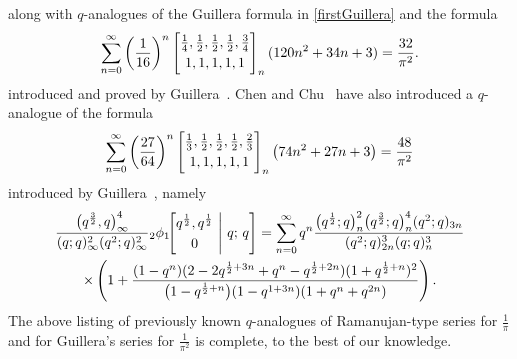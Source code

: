 \documentclass[12pt]{article}
\begin{document}
 along with $q$-analogues of the Guillera formula in \eqref{firstGuillera} and the formula 
 \begin{equation}\label{Guillera16squared}
 \sum_{n=0}^{\infty} \left( \frac{1}{16} \right)^{n} 
 \left[ \begin{matrix} 
 \frac{1}{4}, \frac{1}{2}, \frac{1}{2}, \frac{1}{2}, \frac{3}{4} \vspace{1mm} \\ 
 1, 1, 1, 1, 1 \end{matrix} \right]_{n} (120 n^2+34 n+3) = \frac{32}{\pi ^2}. 
\end{equation}
 introduced and proved by Guillera~\cite{Guillera2002}. 
 Chen and Chu~\cite{ChenChu2021IJNT} have also introduced a $q$-analogue of 
 the formula 
\begin{equation*}
 \sum_{n=0}^{\infty} 
 \left( \frac{27}{64} \right)^{n} 
 \left[ \begin{matrix} 
 \frac{1}{3}, \frac{1}{2}, \frac{1}{2}, \frac{1}{2}, \frac{2}{3} \vspace{1mm} \\ 
 1, 1, 1, 1, 1 \end{matrix} \right]_{n} \left( 74n^2 + 27 n + 3 \right) 
 = \frac{48}{\pi ^2} 
 \end{equation*}
 introduced by Guillera~\cite{Guillera2011}, namely 
 \begin{multline*} 
 \frac{ \big( q^{\frac{3}{2}}, q \big)_{\infty}^{4} }{ 
 (q;q)_{\infty}^{2} (q^2;q)_{\infty}^{2} } {}_{2}\phi_{1}\!\!\left[ \begin{matrix} 
 q^{\frac{1}{2}}, q^{\frac{1}{2}} \vspace{1mm}\\ 
 0 \end{matrix} \ \Bigg| \ q; \, q 
 \right] = \sum_{n=0}^{\infty} q^{n} 
 \frac{ \big( q^{\frac{1}{2}}; q \big)_{n}^{2} 
 \big( q^{\frac{3}{2}}; q \big)_{n}^{4} 
 (q^2;q)_{3n} }{ (q^2;q)_{2n}^{3} (q;q)_{n}^{3} } \\ 
 \times \left( 1 + \frac{ (1-q^n) (2-2 q^{\frac{1}{2} + 3n} +q^n - q^{\frac{1}{2} + 2n} ) 
 (1 + q^{\frac{1}{2} +n} )^2 }{ 
 \big( 1 - q^{\frac{1}{2} +n} \big) 
 (1 - q^{1+3n}) (1 + q^n +q^{2n}) } \right). 
\end{multline*}
 The above listing of previously known $q$-analogues of
 Ramanujan-type series for $\frac{1}{\pi}$
 and for Guillera's series for $\frac{1}{\pi^2}$ is complete, to the best of our knowledge. 
\end{document}
